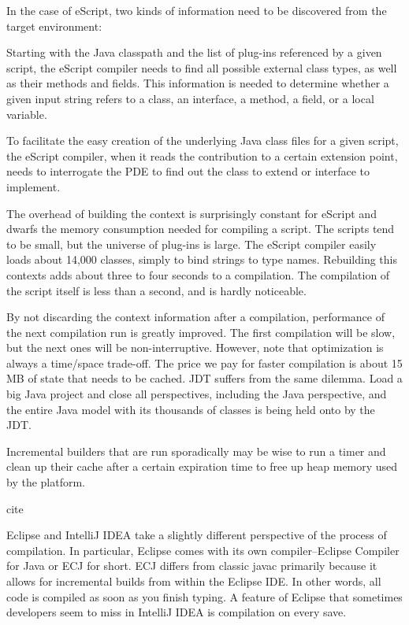 In the case of eScript, two kinds of information need to be discovered from the target environment:

    Starting with the Java classpath and the list of plug-ins referenced by a given script, the eScript compiler needs to find all possible external class types, as well as their methods and fields. This information is needed to determine whether a given input string refers to a class, an interface, a method, a field, or a local variable. 

    To facilitate the easy creation of the underlying Java class files for a given script, the eScript compiler, when it reads the contribution to a certain extension point, needs to interrogate the PDE to find out the class to extend or interface to implement. 

The overhead of building the context is surprisingly constant for eScript and dwarfs the memory consumption needed for compiling a script. The scripts tend to be small, but the universe of plug-ins is large. The eScript compiler easily loads about 14,000 classes, simply to bind strings to type names. Rebuilding this contexts adds about three to four seconds to a compilation. The compilation of the script itself is less than a second, and is hardly noticeable.

By not discarding the context information after a compilation, performance of the next compilation run is greatly improved. The first compilation will be slow, but the next ones will be non-interruptive. However, note that optimization is always a time/space trade-off. The price we pay for faster compilation is about 15 MB of state that needs to be cached. JDT suffers from the same dilemma. Load a big Java project and close all perspectives, including the Java perspective, and the entire Java model with its thousands of classes is being held onto by the JDT.

Incremental builders that are run sporadically may be wise to run a timer and clean up their cache after a certain expiration time to free up heap memory used by the platform. 

cite 

Eclipse and IntelliJ IDEA take a slightly different perspective of the process of compilation. In particular, Eclipse comes with its own compiler--Eclipse Compiler for Java or ECJ for short. ECJ differs from classic javac primarily because it allows for incremental builds from within the Eclipse IDE. In other words, all code is compiled as soon as you finish typing.
A feature of Eclipse that sometimes developers seem to miss in IntelliJ IDEA is compilation on every save. 

